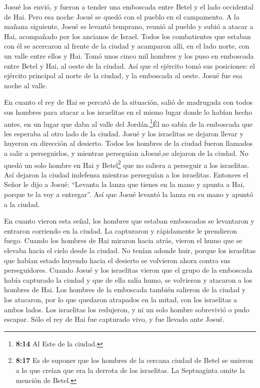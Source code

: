  Josué los envió, y fueron a tender una emboscada entre
Betel y el lado occidental de Hai. Pero esa noche Josué se quedó con el
pueblo en el campamento.  A la mañana siguiente, Josué se
levantó temprano, reunió al pueblo y subió a atacar a Hai, acompañado
por los ancianos de Israel.  Todos los combatientes que
estaban con él se acercaron al frente de la ciudad y acamparon allí, en
el lado norte, con un valle entre ellos y Hai.  Tomó unos
cinco mil hombres y los puso en emboscada entre Betel y Hai, al oeste de
la ciudad.  Así que el ejército tomó sus posiciones: el
ejército principal al norte de la ciudad, y la emboscada al oeste. Josué
fue esa noche al valle.

 En cuanto el rey de Hai se percató de la situación, salió
de madrugada con todos sus hombres para atacar a los israelitas en el
mismo lugar donde lo habían hecho antes, en un lugar que daba al valle
del Jordán.\footnote{\textbf{8:14} Al Este de la ciudad.}Él no sabía de
la emboscada que les esperaba al otro lado de la ciudad. 
Josué y los israelitas se dejaron llevar y huyeron en dirección al
desierto.  Todos los hombres de la ciudad fueron llamados a
salir a perseguirlos, y mientras perseguían aJosué,se alejaron de la
ciudad.  No quedó un solo hombre en Hai y Betel\footnote{\textbf{8:17}
  Es de suponer que los hombres de la cercana ciudad de Betel se unieron
  a lo que creían que era la derrota de los israelitas. La Septuaginta
  omite la mención de Betel.} que no saliera a perseguir a los
israelitas. Así dejaron la ciudad indefensa mientras perseguían a los
israelitas.  Entonces el Señor le dijo a Josué: ``Levanta
la lanza que tienes en la mano y apunta a Hai, porque te la voy a
entregar''. Así que Josué levantó la lanza en su mano y apuntó a la
ciudad.

 En cuanto vieron esta señal, los hombres que estaban
emboscados se levantaron y entraron corriendo en la ciudad. La
capturaron y rápidamente le prendieron fuego.  Cuando los
hombres de Hai miraron hacia atrás, vieron el humo que se elevaba hacia
el cielo desde la ciudad. No tenían adonde huir, porque los israelitas
que habían estado huyendo hacia el desierto se volvieron ahora contra
sus perseguidores.  Cuando Josué y los israelitas vieron
que el grupo de la emboscada había capturado la ciudad y que de ella
salía humo, se volvieron y atacaron a los hombres de Hai. 
Los hombres de la emboscada también salieron de la ciudad y los
atacaron, por lo que quedaron atrapados en la mitad, con los israelitas
a ambos lados. Los israelitas los redujeron, y ni un solo hombre
sobrevivió o pudo escapar.  Sólo el rey de Hai fue
capturado vivo, y fue llevado ante Josué.

